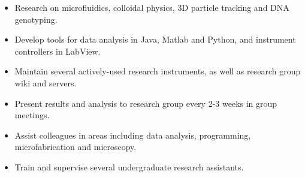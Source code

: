 \documentclass[10pt]{article}
\begin{document}
\begin{itemize}\setlength{\itemsep}{0cm}
  \setlength{\parskip}{0cm}

\item Research on microfluidics, colloidal physics, 3D particle tracking and DNA genotyping.





\item Develop tools for data analysis in Java, Matlab and Python, and instrument controllers in LabView.

\item Maintain several actively-used research instruments, as well as research group wiki and servers.

\item Present results and analysis to research group every 2-3 weeks in group meetings.

\item Assist colleagues in areas including data analysis, programming, microfabrication and microscopy.

\item Train and supervise several undergraduate research assistants.



\end{itemize}
\end{document}
